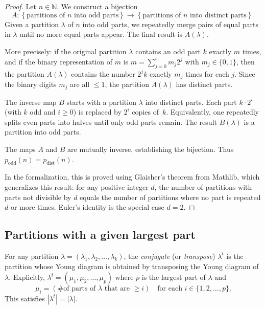 \begin{proof}
\leanok
Let $n\in\mathbb{N}$. We construct a bijection
\[
A:\left\{  \text{partitions of }n\text{ into odd parts}\right\}
\rightarrow\left\{  \text{partitions of }n\text{ into distinct parts}\right\}.
\]
Given a partition $\lambda$ of $n$ into odd parts, we repeatedly merge pairs
of equal parts in $\lambda$ until no more equal parts appear. The final
result is $A\left(  \lambda\right)  $.

More precisely: if the original partition $\lambda$ contains an odd part $k$
exactly $m$ times, and if the binary representation of $m$ is
$m = \sum_{j=0}^{i} m_j 2^j$ with $m_j \in \{0,1\}$, then the partition
$A(\lambda)$ contains the number $2^j k$ exactly $m_j$ times for each $j$.
Since the binary digits $m_j$ are all $\leq 1$, the partition $A(\lambda)$ has
distinct parts.

The inverse map $B$ starts with a partition $\lambda$ into distinct parts.
Each part $k \cdot 2^i$ (with $k$ odd and $i \geq 0$) is replaced by $2^i$
copies of~$k$. Equivalently, one repeatedly splits even parts into halves
until only odd parts remain. The result $B(\lambda)$ is a partition into odd parts.

The maps $A$ and $B$ are mutually inverse, establishing the bijection.
Thus $p_{\operatorname{odd}}(n) = p_{\operatorname{dist}}(n)$.

In the formalization, this is proved using Glaisher's theorem from Mathlib,
which generalizes this result: for any positive integer $d$, the number of
partitions with parts not divisible by $d$ equals the number of partitions
where no part is repeated $d$ or more times. Euler's identity is the
special case $d = 2$.
\end{proof}

\subsection{Partitions with a given largest part}

\begin{lemma}
\label{lem.pars.transpose-def}
\leanhelper
\leanok
For any partition $\lambda = (\lambda_1, \lambda_2, \ldots, \lambda_k)$,
the \emph{conjugate} (or \emph{transpose}) $\lambda^t$ is the partition
whose Young diagram is obtained by transposing the Young diagram of $\lambda$.
Explicitly, $\lambda^t = (\mu_1, \mu_2, \ldots, \mu_p)$ where $p$ is the
largest part of $\lambda$ and
\[
\mu_i = \left( \text{\# of parts of } \lambda \text{ that are } \geq i \right)
\quad \text{for each } i \in \{1, 2, \ldots, p\}.
\]
This satisfies $|\lambda^t| = |\lambda|$.
\end{lemma}

